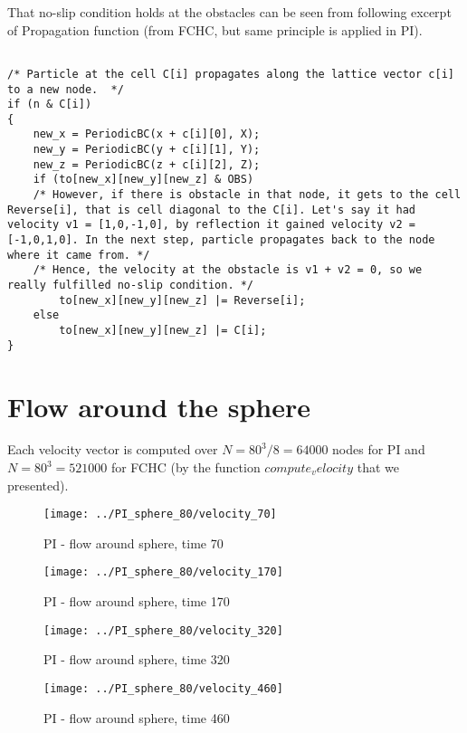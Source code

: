 That no-slip condition holds at the obstacles can be seen from following excerpt of Propagation function (from FCHC, but same principle is applied in PI).
\begin{lstlisting}

/* Particle at the cell C[i] propagates along the lattice vector c[i] to a new node.  */
if (n & C[i])
{
	new_x = PeriodicBC(x + c[i][0], X);
	new_y = PeriodicBC(y + c[i][1], Y);
	new_z = PeriodicBC(z + c[i][2], Z);
	if (to[new_x][new_y][new_z] & OBS)	
	/* However, if there is obstacle in that node, it gets to the cell Reverse[i], that is cell diagonal to the C[i]. Let's say it had velocity v1 = [1,0,-1,0], by reflection it gained velocity v2 = [-1,0,1,0]. In the next step, particle propagates back to the node where it came from. */
	/* Hence, the velocity at the obstacle is v1 + v2 = 0, so we really fulfilled no-slip condition. */	
		to[new_x][new_y][new_z] |= Reverse[i];
	else
		to[new_x][new_y][new_z] |= C[i];
}
\end{lstlisting}

\section{Flow around the sphere} 
Each velocity vector is computed over $N = 80^3 / 8 = 64000$ nodes for PI and $N = 80^3 = 521 000$ for FCHC (by the function $compute_velocity$ that we presented).

\begin{figure}[htbp]
 \centering 
 \texttt{[image: ../PI\_sphere\_80/velocity\_70]}
 \label{transitions}
 \caption{PI - flow around sphere, time 70}
\end{figure}


\begin{figure}[htbp]
 \centering 
 \texttt{[image: ../PI\_sphere\_80/velocity\_170]}
 \label{transitions}
 \caption{PI - flow around sphere, time 170}
\end{figure}


\begin{figure}[htbp]
 \centering 
 \texttt{[image: ../PI\_sphere\_80/velocity\_320]}
 \label{transitions}
 \caption{PI - flow around sphere, time 320}
\end{figure}


\begin{figure}[htbp]
 \centering 
 \texttt{[image: ../PI\_sphere\_80/velocity\_460]}
 \label{transitions}
 \caption{PI - flow around sphere, time 460}
\end{figure}


